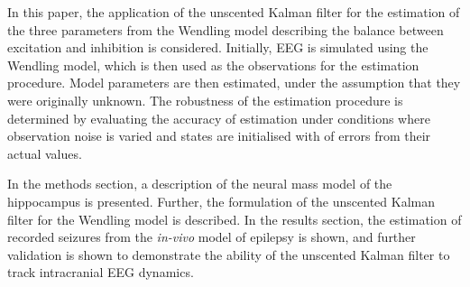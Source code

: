 
In this paper, the application of the unscented Kalman filter for the estimation of the three parameters from the Wendling model describing the balance between excitation and inhibition is considered. Initially, EEG is simulated using the Wendling model, which is then used as the observations for the estimation procedure. Model parameters are then estimated, under the assumption that they were originally unknown. The robustness of the estimation procedure is determined by evaluating the accuracy of estimation under conditions where observation noise is varied and states are initialised with of errors from their actual values.

In the methods section, a description of the neural mass model of the hippocampus is presented. Further, the formulation of the unscented Kalman filter for the Wendling model is described. In the results section, the estimation of recorded seizures from the \textsl{in-vivo} model of epilepsy is shown, and further validation is shown to demonstrate the ability of the unscented Kalman filter to track intracranial EEG dynamics. 
